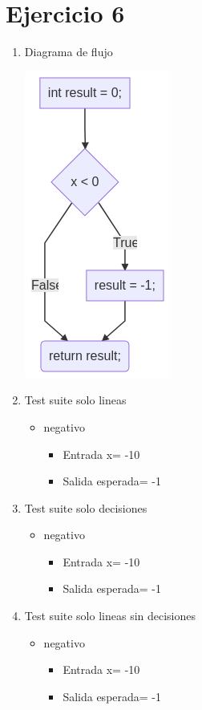 \documentclass{article}
\begin{document}
\section*{Ejercicio 6}

\begin{enumerate}
    \item Diagrama de flujo
    
    \includegraphics[scale=0.65]{recursos/signo.png}

    \item Test suite solo lineas
        \begin{itemize}
            \item negativo
                \begin{itemize}
                    \item Entrada x= -10
                    \item Salida esperada= -1
                \end{itemize}
        \end{itemize}

    \item Test suite solo decisiones
    \begin{itemize}
        \item negativo
            \begin{itemize}
                \item Entrada x= -10
                \item Salida esperada= -1
            \end{itemize}
    \end{itemize}

    \item Test suite solo lineas sin decisiones
    \begin{itemize}
        \item negativo
            \begin{itemize}
                \item Entrada x= -10
                \item Salida esperada= -1
            \end{itemize}
    \end{itemize}
\end{enumerate}
\end{document}
